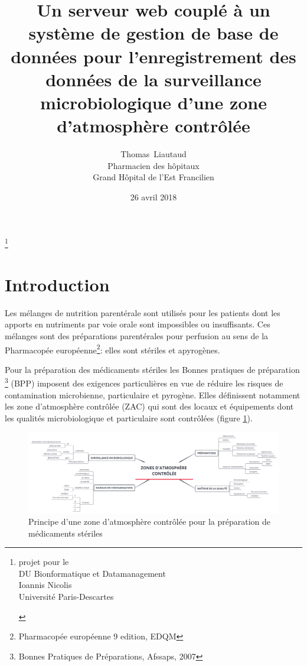 \documentclass[12pt,a4paper,oneside]{article}
\author{Thomas~Liautaud\\Pharmacien des hôpitaux\\Grand Hôpital de l'Est Francilien}
\date{26 avril 2018}
\title{Un serveur web couplé à un système de gestion de base de données pour l'enregistrement des données de la surveillance microbiologique d'une zone d'atmosphère contrôlée}
\begin{document}
\maketitle
\thanks{\begin{center}
projet pour le \\DU Bionformatique et Datamanagement\\ Ioannis Nicolis\\Université Paris-Descartes
\end{center}}
\tableofcontents
\section{Introduction}
Les mélanges de nutrition parentérale sont utilisés pour les patients dont les apports en nutriments par voie orale sont impossibles ou insuffisants. Ces mélanges sont des préparations parentérales pour perfusion au sens de la Pharmacopée européenne\footnote{Pharmacopée européenne 9 edition, EDQM}: elles sont stériles et apyrogènes.

Pour la préparation des médicaments stériles les Bonnes pratiques de préparation \footnote{Bonnes Pratiques de Préparations, Afssaps, 2007} (BPP) imposent des  exigences  particulières en vue de réduire les risques de contamination microbienne, particulaire et pyrogène. Elles définissent notamment les zone d'atmosphère contrôlée (ZAC) qui sont des locaux et équipements dont les qualités microbiologique et particulaire sont contrôlées (figure \ref{zac}).

\begin{figure}[h]
\caption{\label{zac}Principe d'une zone d'atmosphère contrôlée pour la préparation de médicaments stériles}
\includegraphics[scale=0.25]{zac.png}
\end{figure}
\end{document}
